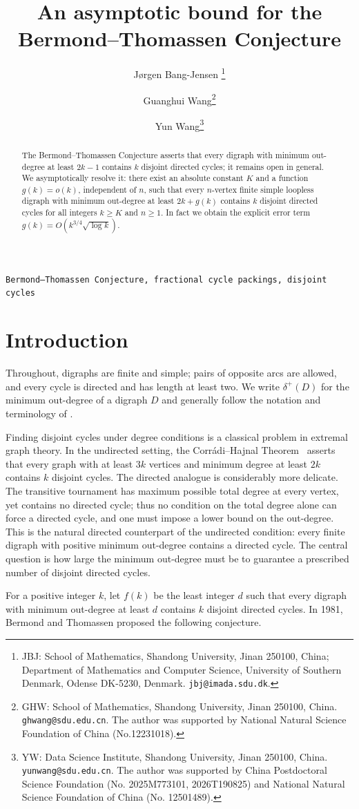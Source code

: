\documentclass[a4paper,12pt]{article}
\title{An asymptotic bound for the Bermond--Thomassen Conjecture}
\author{ J\o rgen Bang-Jensen \thanks{JBJ: School of Mathematics,  Shandong University, Jinan 250100, China; Department of Mathematics and Computer Science, University of Southern Denmark, Odense DK-5230, Denmark. \texttt{jbj@imada.sdu.dk}.} \and
	Guanghui Wang\thanks{GHW: School of Mathematics,  Shandong University, Jinan 250100, China.   \texttt{ghwang@sdu.edu.cn}. The author was supported by National Natural Science Foundation of China (No.12231018).} \and
	Yun Wang\thanks{YW: Data Science Institute, Shandong University, Jinan 250100, China. \texttt{yunwang@sdu.edu.cn}. The author was supported by China Postdoctoral Science Foundation (No. 2025M773101, 2026T190825) and National Natural Science Foundation of China (No. 12501489).}}
\date{}
\numberwithin{equation}{section}
\begin{document}
\maketitle

\begin{abstract}
The Bermond--Thomassen Conjecture asserts that every digraph with
minimum out-degree at least $2k-1$ contains $k$ disjoint
directed cycles; it remains open in general. We asymptotically
resolve it: there exist an absolute constant $K$ and a function
$g(k)=o(k)$, independent of $n$, such that every $n$-vertex finite
simple loopless digraph with minimum out-degree at least $2k+g(k)$
contains $k$ disjoint directed cycles for all integers $k\ge K$ and
$n\ge1$. In fact we obtain the explicit
error term $g(k)=O(k^{3/4}\sqrt{\log k})$. 
\end{abstract}


 \texttt{Bermond--Thomassen Conjecture, fractional cycle packings, disjoint  cycles}

\section{Introduction}
Throughout, digraphs are finite and simple; pairs of
opposite arcs are allowed, and every cycle is directed and has length at
least two. We write $\delta^+(D)$ for the minimum out-degree of a
digraph $D$ and generally follow the notation and terminology of \cite{bang2009}.


Finding disjoint cycles under degree conditions is a classical problem
in extremal graph theory. In the undirected setting, the
Corr\'adi--Hajnal Theorem~\cite{corradiAMASH14} asserts that every graph with at
least $3k$ vertices and minimum degree at least $2k$ contains $k$
disjoint cycles. The directed analogue is considerably more delicate.
The transitive tournament has 
maximum possible total degree at every vertex, yet contains no directed
cycle; thus no condition on the total degree alone can force a directed
cycle, and one must impose a lower bound on the out-degree. This is the
natural directed counterpart of the undirected condition: every finite
digraph with positive minimum out-degree contains a directed cycle. The
central question is how large the minimum out-degree must be to
guarantee a prescribed number of disjoint directed cycles.


For a positive integer $k$, let $f(k)$ be the least integer $d$ such
that every digraph with minimum out-degree at least $d$ contains $k$
disjoint directed cycles. In 1981, Bermond and
Thomassen proposed the following conjecture.
\end{document}
